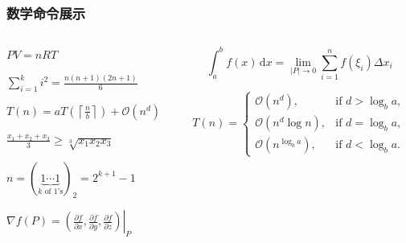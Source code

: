 \begin{shadedsection}
\begin{frame}
  \frametitle{数学命令展示}
  \begin{columns}
    \begin{column}{0.33\textwidth}
      \begin{exampleblock}{}
        $PV=nRT$
      \end{exampleblock}
      \begin{exampleblock}{}
        $\sum_{i=1}^ki^2=\frac{n(n+1)(2n+1)}{6}$
      \end{exampleblock}
      \begin{exampleblock}{}
        $T(n) = aT\left(\left\lceil\frac{n}{b}\right\rceil\right) + \mathcal{O}(n^d)$
      \end{exampleblock}
      \begin{exampleblock}{}
        $\frac{x_{1}+x_{2}+x_{3}}{3}\geq \sqrt[3]{x_{1}x_{2}x_{3}}$
      \end{exampleblock}
      \begin{exampleblock}{}
        $n=(\underbrace{1\cdots 1}_{k\text{ of 1's}})_2=2^{k+1}-1$
      \end{exampleblock}
      \begin{exampleblock}{}
        $\nabla f (P)= \left.\left(\frac{\partial f}{\partial x},\frac{\partial f}{\partial y},\frac{\partial f}{\partial z}\right)\right|_{P}$
      \end{exampleblock}
    \end{column}
    \begin{column}{0.67\textwidth}
      \begin{exampleblock}{}
        \begin{equation*}
          \int_{a}^b f(x)\,\mathrm{d}x=\lim_{|P|\rightarrow 0}\sum_{i=1}^n f(\xi_i)\Delta x_i
        \end{equation*}
      \end{exampleblock}
      \begin{exampleblock}{}
        \begin{equation}
          T(n) = \begin{cases}
            \mathcal{O}(n^d),&\textrm{if } d>\log_b a, \\
            \mathcal{O}(n^d\log n), &\textrm{if } d=\log_b a,\\
            \mathcal{O}(n^{\log_b a}), &\textrm{if } d<\log_b a.
          \end{cases}
        \end{equation}
      \end{exampleblock}

\end{column}
\end{columns}
\end{frame}
\end{shadedsection}
